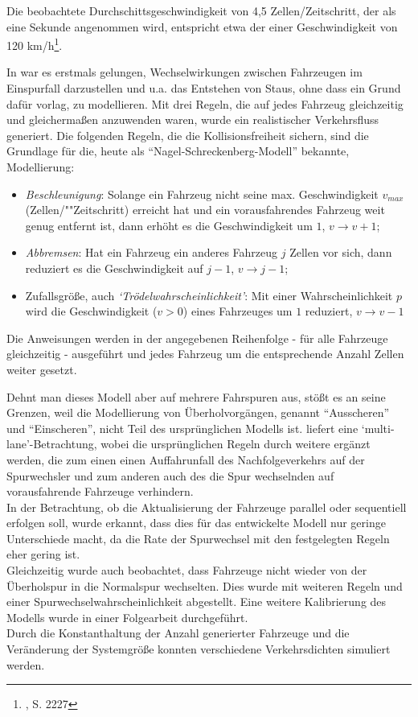 Die beobachtete Durchschittsgeschwindigkeit von 4,5 Zellen/Zeitschritt, der als eine Sekunde angenommen wird, entspricht etwa der einer Geschwindigkeit von 120 km/h\footnote{\cite{na-sch}, S. 2227}. 

In \cite{na-sch} war es erstmals gelungen, Wechselwirkungen zwischen Fahrzeugen im Einspurfall darzustellen %
und u.a. das Entstehen von Staus, ohne dass ein Grund dafür vorlag, zu modellieren. 
Mit drei Regeln, die auf jedes Fahrzeug gleichzeitig und gleichermaßen anzuwenden waren, wurde ein realistischer Verkehrsfluss generiert. 
Die folgenden Regeln, die die Kollisionsfreiheit sichern, sind die Grundlage für die, heute als \enquote{Nagel-Schreckenberg-Modell} bekannte, Modellierung:

\begin{itemize}
\item \textit{Beschleunigung}: Solange ein Fahrzeug nicht seine max. Geschwindigkeit $v_{max}$ (Zellen/""Zeitschritt) erreicht hat und ein vorausfahrendes Fahrzeug weit genug entfernt ist, dann erhöht es die Geschwindigkeit um $1$, $v \rightarrow v+1$;
\item \textit{Abbremsen}: Hat ein Fahrzeug ein anderes Fahrzeug $j$ Zellen vor sich, dann reduziert es die Geschwindigkeit auf $j-1$, $v \rightarrow j-1$;
\item Zufallsgröße, auch \textit{\enquote*{Trödelwahrscheinlichkeit}}: Mit einer Wahrscheinlichkeit $p$ wird die Geschwindigkeit ($v > 0$) eines Fahrzeuges um $1$ reduziert, $v \rightarrow v-1$
\end{itemize}

Die Anweisungen werden in der angegebenen Reihenfolge - für alle Fahrzeuge gleichzeitig - ausgeführt und jedes Fahrzeug um die entsprechende Anzahl Zellen weiter gesetzt.

Dehnt man dieses Modell aber auf mehrere Fahrspuren aus, stößt es an seine Grenzen, weil die Modellierung von Überholvorgängen, genannt \enquote{Ausscheren} und \enquote{Einscheren}, nicht Teil des ursprünglichen Modells ist. 
\cite{multi-lane} liefert eine \enquote*{multi-lane}-Betrachtung, wobei die ursprünglichen Regeln durch weitere ergänzt werden, die zum einen einen Auffahrunfall des Nachfolgeverkehrs auf der Spurwechsler und zum anderen auch des die Spur wechselnden auf vorausfahrende Fahrzeuge verhindern. \\
In der Betrachtung, ob die Aktualisierung der Fahrzeuge parallel oder sequentiell erfolgen soll, wurde erkannt, dass dies für das entwickelte Modell nur geringe Unterschiede macht, da die Rate der Spurwechsel mit den festgelegten Regeln eher gering ist. \\
Gleichzeitig wurde auch beobachtet, dass Fahrzeuge nicht wieder von der Überholspur in die Normalspur wechselten. Dies wurde mit weiteren Regeln und einer Spurwechselwahrscheinlichkeit abgestellt. Eine weitere Kalibrierung des Modells wurde in einer Folgearbeit durchgeführt. \\
Durch die Konstanthaltung der Anzahl generierter Fahrzeuge und die Veränderung der Systemgröße konnten verschiedene Verkehrsdichten simuliert werden.

